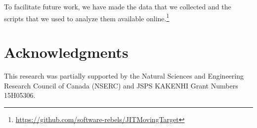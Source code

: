 To facilitate future work, we have made the data that we collected and the scripts that we used to analyze them available online.\footnote{\url{https://github.com/software-rebels/JITMovingTarget}}

\appendices

\section*{Acknowledgments}

This research was partially supported by the Natural Sciences and Engineering Research Council of Canada (NSERC) and JSPS KAKENHI Grant Numbers 15H05306.
